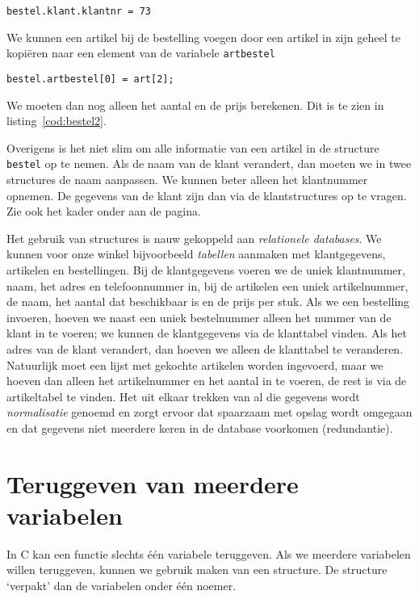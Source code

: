 \hspace*{1em}\texttt{bestel.klant.klantnr = 73}

We kunnen een artikel bij de bestelling voegen door een artikel in zijn geheel te kopiëren naar een element van de variabele \texttt{artbestel}

\hspace*{1em}\texttt{bestel.artbestel[0] = art[2];}

We moeten dan nog alleen het aantal en de prijs berekenen. Dit is te zien in listing~\ref{cod:bestel2}.


Overigens is het niet slim om alle informatie van een artikel in de structure \texttt{bestel} op te nemen. Als de naam van de klant verandert, dan moeten we in twee structures de naam aanpassen. We kunnen beter alleen het klantnummer opnemen. De gegevens van de klant zijn dan via de klantstructures op te vragen. Zie ook het kader onder aan de pagina.

\begin{infobox}
Het gebruik van structures is nauw gekoppeld aan \textsl{relationele databases}. We kunnen voor onze winkel bijvoorbeeld \textsl{tabellen} aanmaken met klantgegevens, artikelen en bestellingen. Bij de klantgegevens voeren we de uniek klantnummer, naam, het adres en telefoonnummer in, bij de artikelen een uniek artikelnummer, de naam, het aantal dat beschikbaar is en de prijs per stuk. Als we een bestelling invoeren, hoeven we naast een uniek bestelnummer alleen het nummer van de klant in te voeren; we kunnen de klantgegevens via de klanttabel vinden. Als het adres van de klant verandert, dan hoeven we alleen de klanttabel te veranderen. Natuurlijk moet een lijst met gekochte artikelen worden ingevoerd, maar we hoeven dan alleen het artikelnummer en het aantal in te voeren, de rest is via de artikeltabel te vinden. Het uit elkaar trekken van al die gegevens wordt \textsl{normalisatie} genoemd en zorgt ervoor dat spaarzaam met opslag wordt omgegaan en dat gegevens niet meerdere keren in de database voorkomen (redundantie).
\end{infobox}


\section{Teruggeven van meerdere variabelen}
In C kan een functie slechts één variabele teruggeven. Als we meerdere variabelen willen teruggeven, kunnen we gebruik maken van een structure. De structure `verpakt' dan de variabelen onder één noemer.

